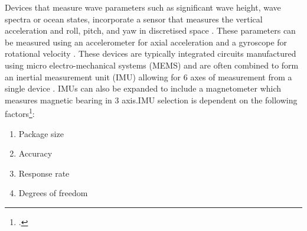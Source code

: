 Devices that measure wave parameters such as significant wave height, wave spectra or ocean states, incorporate a sensor that measures the vertical acceleration and roll, pitch, and yaw in discretised space \cite{earle1996nondirectional}. These parameters can be measured using an accelerometer for axial acceleration and a gyroscope for rotational velocity \cite{fong2008methods}. These devices are typically integrated circuits manufactured using micro electro-mechanical systems (MEMS) and are often combined to form an inertial measurement unit (IMU) allowing for 6 axes of measurement from a single device \cite{fong2008methods}. IMUs can also be expanded to include a magnetometer which measures magnetic bearing in 3 axis\cite{ahmad2013reviews}.IMU selection is dependent on the following factors\footcite{ahmad2013reviews}:
\begin{enumerate}
	\item Package size
	\item Accuracy
	\item Response rate
	\item Degrees of freedom
\end{enumerate}

